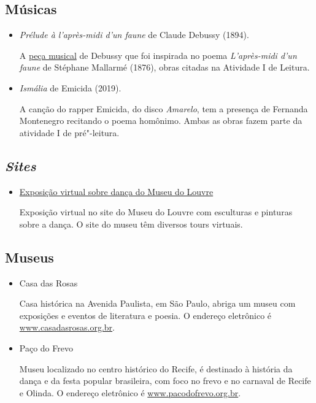 \documentclass[12pt]{extarticle}
\begin{document}
\subsection{Músicas}

\begin{itemize}

\item \textit{Prélude à l'après-midi
d'un faune} de Claude Debussy (1894).

A \href{https://www.youtube.com/watch?v=bYyK922PsUw}{peça musical} de Debussy que foi inspirada no poema \textit{L'après-midi d'un faune} 
de Stéphane Mallarmé (1876), obras citadas na Atividade I de Leitura.

\item \textit{Ismália} de Emicida (2019).

A canção do rapper Emicida, do disco \emph{Amarelo}, tem a presença de Fernanda Montenegro recitando o poema homônimo. Ambas as obras fazem parte da atividade I de pré"-leitura.

\end{itemize}

\subsection{\emph{Sites}}

\begin{itemize}

\item \href{https://petitegalerie.louvre.fr/visite-virtuelle/saison2/}{Exposição virtual sobre dança do Museu do Louvre}

Exposição virtual no site do Museu do Louvre com esculturas e pinturas sobre a dança. O site do museu têm diversos tours virtuais.

\end{itemize}

\subsection{Museus}

\begin{itemize}

\item Casa das Rosas

Casa histórica na Avenida Paulista, em São Paulo, abriga um museu com exposições e eventos de literatura e poesia. O endereço eletrônico é
\url{www.casadasrosas.org.br}.

\item Paço do Frevo

Museu localizado no centro histórico do Recife, é destinado à história da dança e da festa popular brasileira, com foco no frevo e no carnaval de Recife e Olinda. O endereço eletrônico é
\url{www.pacodofrevo.org.br}.

\end{itemize}
\end{document}
